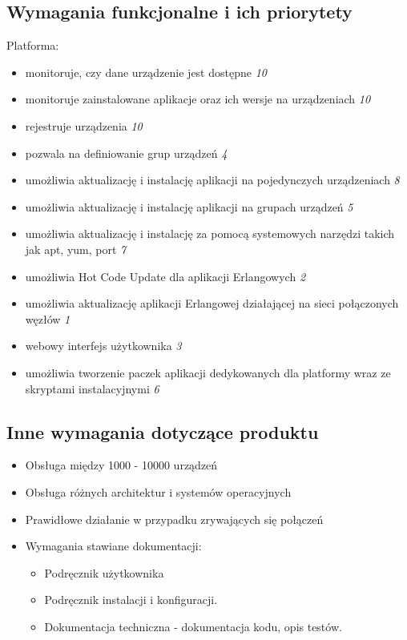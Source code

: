 \documentclass[polish,12pt]{aghthesis}
\begin{document}
\subsection{Wymagania funkcjonalne i ich priorytety}
Platforma:
\begin{itemize}
\item monitoruje, czy dane urządzenie jest dostępne \emph{10}
\item monitoruje zainstalowane aplikacje oraz ich wersje na urządzeniach \emph{10}
\item rejestruje urządzenia \emph{10}
\item pozwala na definiowanie grup urządzeń \emph{4}
\item umożliwia aktualizację i instalację aplikacji na pojedynczych urządzeniach \emph{8}
\item umożliwia aktualizację i instalację aplikacji na grupach urządzeń \emph{5}
\item umożliwia aktualizację i instalację za pomocą systemowych narzędzi takich jak apt, yum, port \emph{7}
\item umożliwia Hot Code Update dla aplikacji Erlangowych \emph{2}
\item umożliwia aktualizację aplikacji Erlangowej działającej na sieci połączonych węzłów \emph{1}
\item webowy interfejs użytkownika \emph{3}
\item umożliwia tworzenie paczek aplikacji dedykowanych dla platformy wraz ze skryptami instalacyjnymi \emph{6}
\end{itemize}

\subsection{Inne wymagania dotyczące produktu}
\begin{itemize}
\item Obsługa między 1000 - 10000 urządzeń
\item Obsługa różnych architektur i systemów operacyjnych
\item Prawidłowe działanie w przypadku zrywających się połączeń
\item Wymagania stawiane dokumentacji:
  \begin{itemize}
  \item Podręcznik użytkownika
  \item Podręcznik instalacji i konfiguracji.
  \item Dokumentacja techniczna - dokumentacja kodu, opis testów.
  \end{itemize}
\end{itemize}
\end{document}
